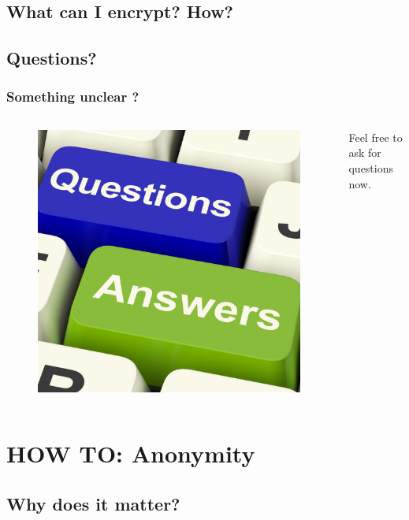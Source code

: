 \documentclass{beamer}
\begin{document}
\subsection{What can I encrypt? How?}
\begin{frame}
\end{frame}

\subsection{Questions?}
\begin{frame}
\frametitle{Something unclear ?}
\begin{columns}[c]
\begin{figure}
\includegraphics[width=0.8\linewidth]{./materials/questions}
\end{figure}
Feel free to ask for questions now.
\end{columns}
\end{frame}

\section{HOW TO: Anonymity}
\subsection{Why does it matter?}
\begin{frame}
\end{frame}
\end{document}
